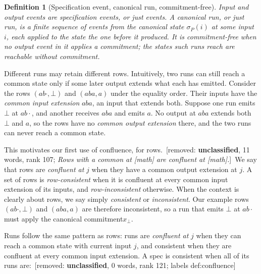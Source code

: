 \documentclass[sigconf]{cidr-2027}
\newtheorem{definition}{Definition}
\theoremstyle{remark}
\newcommand{\commitment}{commitment\xspace}
\newcommand{\inrel}{extends\xspace}          %
\newcommand{\indesc}{input extension\xspace} %
\newcommand{\outrel}{extends\xspace}          %
\newcommand{\outnoun}{output extension\xspace}%
\newcommand{\removednote}[1]{{\color{cutred}\footnotesize\,[removed: #1]\,}}
\begin{document}
\begin{definition}[Specification event, canonical run, \commitment-free]
\label{def:run}
\textcolor{newblue}{Input and output events are \emph{specification events}, or just \emph{events}.} \textcolor{newblue}{A \emph{canonical run}, or just \emph{run}, is a
finite sequence of events from the
canonical state $\sigma_P(i)$ at some input $i$, each applied to the state the one before it produced.} \textcolor{newblue}{It is
\emph{\commitment-free} when no output event in it applies a \commitment; the
states such runs reach are \emph{reachable without \commitment}.}
\end{definition}
















Different runs may retain different rows. Intuitively, two runs can still
reach a common state only if some later output extends what each has emitted. Consider the rows $(ab\cdot,\bot)$ and $(aba,a)$ under the equality order. Their inputs have the \emph{common \indesc} $aba$, an input that \inrel both. Suppose one run emits $\bot$ at $ab\cdot$, and another receives $aba$ and
emits $a$. No output at $aba$ \outrel both $\bot$ and $a$, so the rows have
no \emph{common \outnoun} there, and the two runs can never reach a common
state.

This motivates our first use of confluence, for rows. \removednote{\textbf{unclassified}, 11 words, rank 107; \textit{Rows with a common at [math] are confluent at [math].}} \textcolor{newblue}{We say that rows are
\emph{confluent at} $j$ when they have a common \outnoun at $j$.} A set of rows is
\emph{row-consistent} when it is confluent at every common \indesc of its
inputs, and \emph{row-inconsistent} otherwise. When the context is clearly
about rows, we say simply \emph{consistent} or \emph{inconsistent}. \textcolor{newblue}{Our example rows $(ab\cdot,\bot)$ and $(aba,a)$ are therefore inconsistent, so a run that emits $\bot$ at $ab\cdot$ must apply the canonical \commitment $x_\bot$.}

\textcolor{newblue}{Runs follow the same pattern as rows: runs are \emph{confluent at} $j$ when they can
reach a common state with current input $j$, and consistent when they are
confluent at every common \indesc.} \textcolor{newblue}{A spec is consistent when all of its
runs are:} \removednote{\textbf{unclassified}, 0 words, rank 121; labels def:confluence}
\end{document}
